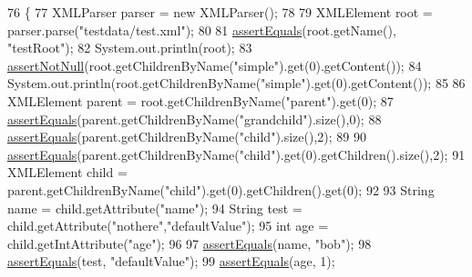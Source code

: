 \begin{DoxyCode}
76                                                                  \{
77         XMLParser parser = \textcolor{keyword}{new} XMLParser();
78         
79         XMLElement root = parser.parse(\textcolor{stringliteral}{"testdata/test.xml"});
80         
81         \mbox{\hyperlink{classorg_1_1newdawn_1_1slick_1_1tests_1_1xml_1_1_x_m_l_test_adbfd9cbd27f7f0377c936ef816a067ac}{assertEquals}}(root.getName(), \textcolor{stringliteral}{"testRoot"});
82         System.out.println(root);
83         \mbox{\hyperlink{classorg_1_1newdawn_1_1slick_1_1tests_1_1xml_1_1_x_m_l_test_a516de8777172f1a41cb9ff310cc3b667}{assertNotNull}}(root.getChildrenByName(\textcolor{stringliteral}{"simple"}).get(0).getContent());
84         System.out.println(root.getChildrenByName(\textcolor{stringliteral}{"simple"}).get(0).getContent());
85         
86         XMLElement parent = root.getChildrenByName(\textcolor{stringliteral}{"parent"}).get(0);
87         \mbox{\hyperlink{classorg_1_1newdawn_1_1slick_1_1tests_1_1xml_1_1_x_m_l_test_adbfd9cbd27f7f0377c936ef816a067ac}{assertEquals}}(parent.getChildrenByName(\textcolor{stringliteral}{"grandchild"}).size(),0);
88         \mbox{\hyperlink{classorg_1_1newdawn_1_1slick_1_1tests_1_1xml_1_1_x_m_l_test_adbfd9cbd27f7f0377c936ef816a067ac}{assertEquals}}(parent.getChildrenByName(\textcolor{stringliteral}{"child"}).size(),2);
89         
90         \mbox{\hyperlink{classorg_1_1newdawn_1_1slick_1_1tests_1_1xml_1_1_x_m_l_test_adbfd9cbd27f7f0377c936ef816a067ac}{assertEquals}}(parent.getChildrenByName(\textcolor{stringliteral}{"child"}).get(0).getChildren().size(),2);
91         XMLElement child = parent.getChildrenByName(\textcolor{stringliteral}{"child"}).get(0).getChildren().get(0);
92         
93         String name = child.getAttribute(\textcolor{stringliteral}{"name"});
94         String test = child.getAttribute(\textcolor{stringliteral}{"nothere"},\textcolor{stringliteral}{"defaultValue"});
95         \textcolor{keywordtype}{int} age = child.getIntAttribute(\textcolor{stringliteral}{"age"});
96         
97         \mbox{\hyperlink{classorg_1_1newdawn_1_1slick_1_1tests_1_1xml_1_1_x_m_l_test_adbfd9cbd27f7f0377c936ef816a067ac}{assertEquals}}(name, \textcolor{stringliteral}{"bob"});
98         \mbox{\hyperlink{classorg_1_1newdawn_1_1slick_1_1tests_1_1xml_1_1_x_m_l_test_adbfd9cbd27f7f0377c936ef816a067ac}{assertEquals}}(test, \textcolor{stringliteral}{"defaultValue"});
99         \mbox{\hyperlink{classorg_1_1newdawn_1_1slick_1_1tests_1_1xml_1_1_x_m_l_test_adbfd9cbd27f7f0377c936ef816a067ac}{assertEquals}}(age, 1);

\end{DoxyCode}
